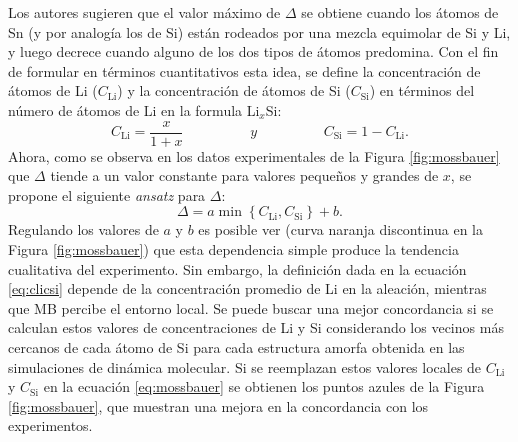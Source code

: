 Los autores sugieren que el valor máximo de $\Delta$ se obtiene cuando los átomos 
de Sn (y por analogía los de Si) están rodeados por una mezcla equimolar de Si y 
Li, y luego decrece cuando alguno de los dos tipos de átomos predomina. Con el fin 
de formular en términos cuantitativos esta idea, se define la concentración de 
átomos de Li ($C_{\text{Li}}$) y la concentración de átomos de Si 
($C_{\text{Si}}$) en términos del número de átomos de Li en la formula Li$_x$Si:
\begin{equation}\label{eq:clicsi}
    C_{\text{Li}} = \frac{x}{1+x} \hspace{2cm}y \hspace{2cm}  C_{\text{Si}} = 1 - C_{\text{Li}}.
\end{equation}
Ahora, como se observa en los datos experimentales de la Figura \ref{fig:mossbauer}
que $\Delta$ tiende a un valor constante para valores pequeños y grandes de $x$, 
se propone el siguiente \textit{ansatz} para $\Delta$:
\begin{equation}\label{eq:mossbauer}
    \Delta = a\min\left\lbrace C_{\text{Li}},C_{\text{Si}}\right\rbrace + b.
\end{equation}
Regulando los valores de $a$ y $b$ es posible ver (curva naranja discontinua en 
la Figura \ref{fig:mossbauer}) que esta dependencia simple produce la tendencia 
cualitativa del experimento. Sin embargo, la definición dada en la ecuación 
\ref{eq:clicsi} depende de la concentración promedio de Li en la aleación, mientras que 
MB percibe el entorno local. Se puede buscar una mejor concordancia si se calculan 
estos valores de concentraciones de Li y Si considerando los vecinos más cercanos
de cada átomo de Si para cada estructura amorfa obtenida en las simulaciones de
dinámica molecular. Si se reemplazan estos valores locales de $C_{\text{Li}}$ y 
$C_{\text{Si}}$ en la ecuación \ref{eq:mossbauer} se obtienen los puntos azules
de la Figura \ref{fig:mossbauer}, que muestran una mejora en la concordancia 
con los experimentos.

